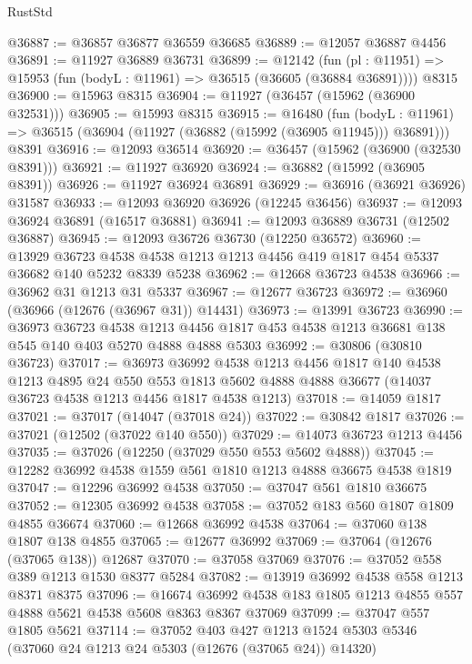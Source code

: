 \begin{lexlean}{RustStd}
\begin{coremodule}
@36887 := @36857 @36877 @36559 @36685
@36889 := @12057 @36887 @4456
@36891 := @11927 @36889 @36731
@36899 := @12142
    (fun (pl : @11951) => @15953 (fun (bodyL : @11961) => @36515 (@36605 (@36884 @36891))))
    @8315
@36900 := @15963 @8315
@36904 := @11927 (@36457 (@15962 (@36900 @32531)))
@36905 := @15993 @8315
@36915 := @16480
    (fun (bodyL : @11961) => @36515 (@36904 (@11927 (@36882 (@15992 (@36905 @11945))) @36891)))
    @8391
@36916 := @12093 @36514
@36920 := @36457 (@15962 (@36900 (@32530 @8391)))
@36921 := @11927 @36920
@36924 := @36882 (@15992 (@36905 @8391))
@36926 := @11927 @36924 @36891
@36929 := @36916 (@36921 @36926) @31587
@36933 := @12093 @36920 @36926 (@12245 @36456)
@36937 := @12093 @36924 @36891 (@16517 @36881)
@36941 := @12093 @36889 @36731 (@12502 @36887)
@36945 := @12093 @36726 @36730 (@12250 @36572)
@36960 := @13929
    @36723
    @4538
    @4538
    @1213
    @1213
    @4456
    @419
    @1817
    @454
    @5337
    @36682
    @140
    @5232
    @8339
    @5238
@36962 := @12668 @36723 @4538
@36966 := @36962 @31 @1213 @31 @5337
@36967 := @12677 @36723
@36972 := @36960 (@36966 (@12676 (@36967 @31)) @14431)
@36973 := @13991 @36723
@36990 := @36973
    @36723
    @4538
    @1213
    @4456
    @1817
    @453
    @4538
    @1213
    @36681
    @138
    @545
    @140
    @403
    @5270
    @4888
    @4888
    @5303
@36992 := @30806 (@30810 @36723)
@37017 := @36973
    @36992
    @4538
    @1213
    @4456
    @1817
    @140
    @4538
    @1213
    @4895
    @24
    @550
    @553
    @1813
    @5602
    @4888
    @4888
    @36677
    (@14037 @36723 @4538 @1213 @4456 @1817 @4538 @1213)
@37018 := @14059 @1817
@37021 := @37017 (@14047 (@37018 @24))
@37022 := @30842 @1817
@37026 := @37021 (@12502 (@37022 @140 @550))
@37029 := @14073 @36723 @1213 @4456
@37035 := @37026 (@12250 (@37029 @550 @553 @5602 @4888))
@37045 := @12282 @36992 @4538 @1559 @561 @1810 @1213 @4888 @36675 @4538 @1819
@37047 := @12296 @36992 @4538
@37050 := @37047 @561 @1810 @36675
@37052 := @12305 @36992 @4538
@37058 := @37052 @183 @560 @1807 @1809 @4855 @36674
@37060 := @12668 @36992 @4538
@37064 := @37060 @138 @1807 @138 @4855
@37065 := @12677 @36992
@37069 := @37064 (@12676 (@37065 @138)) @12687
@37070 := @37058 @37069
@37076 := @37052 @558 @389 @1213 @1530 @8377 @5284
@37082 := @13919 @36992 @4538 @558 @1213 @8371 @8375
@37096 := @16674 @36992 @4538 @183 @1805 @1213 @4855 @557 @4888 @5621 @4538 @5608 @8363 @8367 @37069
@37099 := @37047 @557 @1805 @5621
@37114 := @37052
    @403
    @427
    @1213
    @1524
    @5303
    @5346
    (@37060 @24 @1213 @24 @5303 (@12676 (@37065 @24)) @14320)

\end{coremodule}
\end{lexlean}
